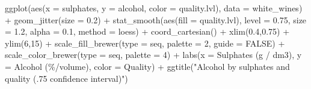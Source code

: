 \documentclass[
  letterpaper,
  DIV=11,
  numbers=noendperiod]{scrreprt}
\newenvironment{Shaded}{\begin{snugshade}}{\end{snugshade}}
\newcommand{\AttributeTok}[1]{\textcolor[rgb]{0.40,0.45,0.13}{#1}}
\newcommand{\ConstantTok}[1]{\textcolor[rgb]{0.56,0.35,0.01}{#1}}
\newcommand{\DecValTok}[1]{\textcolor[rgb]{0.68,0.00,0.00}{#1}}
\newcommand{\FloatTok}[1]{\textcolor[rgb]{0.68,0.00,0.00}{#1}}
\newcommand{\FunctionTok}[1]{\textcolor[rgb]{0.28,0.35,0.67}{#1}}
\newcommand{\NormalTok}[1]{\textcolor[rgb]{0.00,0.23,0.31}{#1}}
\newcommand{\SpecialCharTok}[1]{\textcolor[rgb]{0.37,0.37,0.37}{#1}}
\newcommand{\StringTok}[1]{\textcolor[rgb]{0.13,0.47,0.30}{#1}}
\begin{document}
\begin{Shaded}
\begin{Highlighting}[]
\FunctionTok{ggplot}\NormalTok{(}\FunctionTok{aes}\NormalTok{(}\AttributeTok{x =}\NormalTok{ sulphates, }\AttributeTok{y =}\NormalTok{ alcohol, }\AttributeTok{color =}\NormalTok{ quality.lvl), }
       \AttributeTok{data =}\NormalTok{ white\_wines) }\SpecialCharTok{+}
  \FunctionTok{geom\_jitter}\NormalTok{(}\AttributeTok{size =} \FloatTok{0.2}\NormalTok{) }\SpecialCharTok{+}
  \FunctionTok{stat\_smooth}\NormalTok{(}\FunctionTok{aes}\NormalTok{(}\AttributeTok{fill =}\NormalTok{ quality.lvl),}
              \AttributeTok{level =} \FloatTok{0.75}\NormalTok{, }\AttributeTok{size =} \FloatTok{1.2}\NormalTok{, }\AttributeTok{alpha =} \FloatTok{0.1}\NormalTok{, }\AttributeTok{method =} \StringTok{\textquotesingle{}loess\textquotesingle{}}\NormalTok{) }\SpecialCharTok{+}
  \FunctionTok{coord\_cartesian}\NormalTok{() }\SpecialCharTok{+}
  \FunctionTok{xlim}\NormalTok{(}\FloatTok{0.4}\NormalTok{,}\FloatTok{0.75}\NormalTok{) }\SpecialCharTok{+}
  \FunctionTok{ylim}\NormalTok{(}\DecValTok{6}\NormalTok{,}\DecValTok{15}\NormalTok{) }\SpecialCharTok{+}
  \FunctionTok{scale\_fill\_brewer}\NormalTok{(}\AttributeTok{type =} \StringTok{\textquotesingle{}seq\textquotesingle{}}\NormalTok{, }\AttributeTok{palette =} \DecValTok{2}\NormalTok{, }\AttributeTok{guide =} \ConstantTok{FALSE}\NormalTok{) }\SpecialCharTok{+}
  \FunctionTok{scale\_color\_brewer}\NormalTok{(}\AttributeTok{type =} \StringTok{\textquotesingle{}seq\textquotesingle{}}\NormalTok{, }\AttributeTok{palette =} \DecValTok{4}\NormalTok{) }\SpecialCharTok{+}
  \FunctionTok{labs}\NormalTok{(}\AttributeTok{x =} \StringTok{\textquotesingle{}Sulphates (g / dm3)\textquotesingle{}}\NormalTok{, }
       \AttributeTok{y =} \StringTok{\textquotesingle{}Alcohol (\%/volume)\textquotesingle{}}\NormalTok{, }
       \AttributeTok{color =} \StringTok{\textquotesingle{}Quality\textquotesingle{}}\NormalTok{) }\SpecialCharTok{+}
  \FunctionTok{ggtitle}\NormalTok{(}\StringTok{"Alcohol by sulphates and quality (.75 confidence interval)"}\NormalTok{)}
\end{Highlighting}
\end{Shaded}
\end{document}
